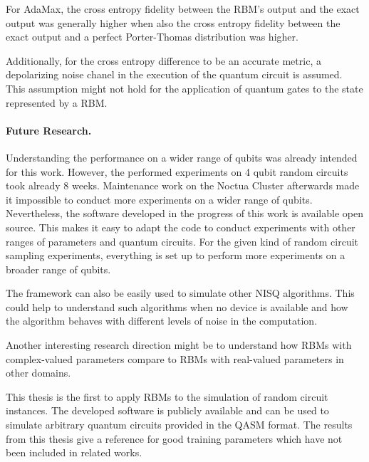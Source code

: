 For AdaMax, the cross entropy fidelity between the RBM's output and the exact output was 
generally higher when also the cross entropy fidelity between the exact output and a perfect Porter-Thomas 
distribution was higher. 

Additionally, for the cross entropy difference to be an accurate 
metric, a depolarizing noise chanel in the execution of the quantum circuit is assumed. This assumption 
might not hold for the application of quantum gates to the state represented by a RBM.

\paragraph{Future Research.}
Understanding the performance on a wider range of qubits was already intended for this work. 
However, the performed experiments 
on 4 qubit random circuits took already 8 weeks. Maintenance work on the Noctua Cluster 
afterwards made it impossible to conduct more experiments on a wider range of qubits.
Nevertheless, the software developed in the progress of this work is available open source. 
This makes it easy to adapt the code to conduct experiments 
with other ranges of parameters and quantum circuits. For the given kind of random circuit 
sampling experiments, everything is set up to perform more experiments on a broader range of 
qubits.

The framework can also be easily used to simulate other NISQ algorithms. This could help to 
understand such algorithms when no device is available and how the algorithm
behaves with different levels of noise in the computation.

Another interesting research direction might be 
to understand how RBMs with complex-valued parameters compare to RBMs with real-valued parameters 
in other domains.

This thesis is the first to apply RBMs to the simulation of random circuit instances. 
The developed software is publicly available and can be used to simulate arbitrary quantum 
circuits provided in the QASM format. The results from 
this thesis give a reference for good training parameters which have not been included in related works.


